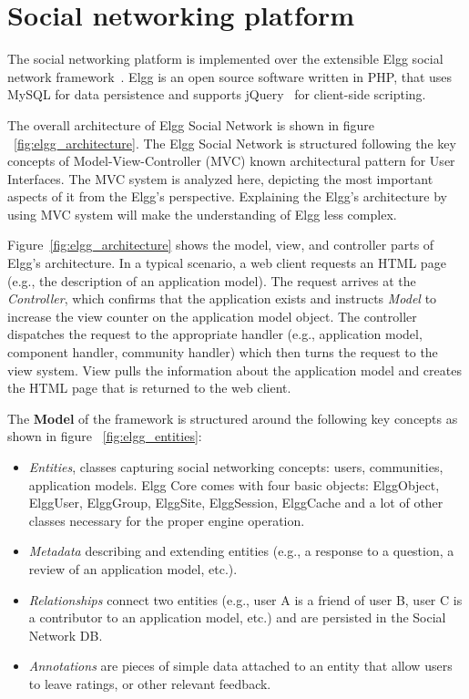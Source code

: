 \section{Social networking platform}
\label{sec:implementaion_of_social_netowrk}
The social networking platform is implemented over the extensible Elgg social network framework~\cite{elgg_url}.  Elgg is an open source software written in PHP, that uses MySQL for data persistence and supports jQuery~\cite{jquery_url} for client-side scripting.  

The overall architecture of Elgg Social Network is shown in figure ~\ref{fig:elgg_architecture}. The Elgg Social Network is structured following the key concepts of Model-View-Controller (MVC) known architectural pattern for User Interfaces. The MVC system is analyzed here, depicting the most important aspects of it from the Elgg's perspective. Explaining the Elgg's architecture by using MVC system will make the understanding of Elgg less complex.

Figure~\ref{fig:elgg_architecture} shows the model, view, and controller parts of Elgg's architecture. In a typical scenario, a web client requests an HTML page (e.g., the description of an application model).  The request arrives at the \emph{Controller}, which confirms that the application exists and instructs \emph{Model} to increase the view counter on the application model object. The controller dispatches the request to the appropriate handler (e.g., application model, component handler, community handler) which then turns the request to the view system. View pulls the information about the application model and creates the HTML page that is returned to the web client.

The {\bf Model} of the framework is structured around the following key concepts as shown in figure ~\ref{fig:elgg_entities}:
\begin{itemize}
\item \emph{Entities}, classes capturing social networking concepts: users, communities, application models. Elgg Core comes with four basic objects: ElggObject, ElggUser, ElggGroup, ElggSite, ElggSession, ElggCache and a lot of other classes necessary for the proper engine operation.
\item \emph{Metadata} describing and extending entities (e.g., a response to a question, a review of an application model, etc.).
\item  \emph{Relationships} connect two entities (e.g., user A is a friend of user B, user C is a contributor to an application model, etc.) and are persisted in the Social Network DB.
\item \emph{Annotations} are pieces of simple data attached to an entity that allow users to leave ratings, or other relevant feedback.
\end{itemize}

